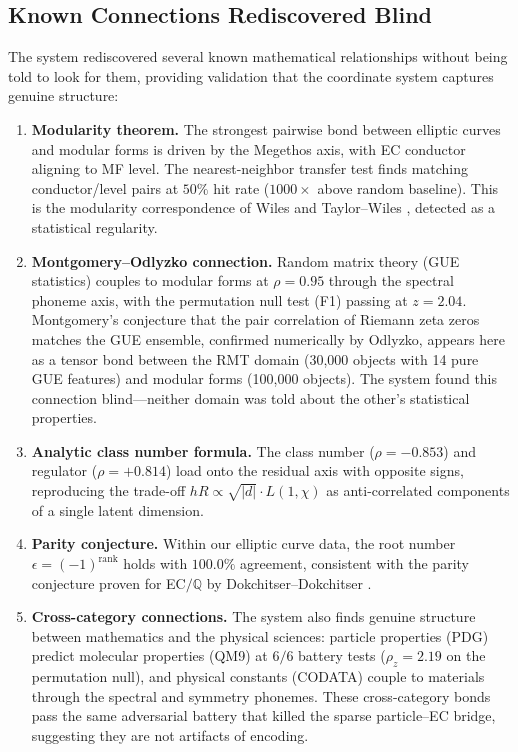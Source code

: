 \documentclass[11pt,a4paper]{article}
\begin{document}
\subsection{Known Connections Rediscovered Blind}

The system rediscovered several known mathematical relationships without being told to look for them, providing validation that the coordinate system captures genuine structure:

\begin{enumerate}[nosep]
    \item \textbf{Modularity theorem.} The strongest pairwise bond between elliptic curves and modular forms is driven by the Megethos axis, with EC conductor aligning to MF level. The nearest-neighbor transfer test finds matching conductor/level pairs at $50\%$ hit rate ($1000\times$ above random baseline). This is the modularity correspondence of Wiles and Taylor--Wiles \cite{dokchitser}, detected as a statistical regularity.

    \item \textbf{Montgomery--Odlyzko connection.} Random matrix theory (GUE statistics) couples to modular forms at $\rho = 0.95$ through the spectral phoneme axis, with the permutation null test (F1) passing at $z = 2.04$. Montgomery's conjecture that the pair correlation of Riemann zeta zeros matches the GUE ensemble, confirmed numerically by Odlyzko, appears here as a tensor bond between the RMT domain (30,000 objects with 14 pure GUE features) and modular forms (100,000 objects). The system found this connection blind---neither domain was told about the other's statistical properties.

    \item \textbf{Analytic class number formula.} The class number ($\rho = -0.853$) and regulator ($\rho = +0.814$) load onto the residual axis with opposite signs, reproducing the trade-off $hR \propto \sqrt{|d|} \cdot L(1, \chi)$ as anti-correlated components of a single latent dimension.

    \item \textbf{Parity conjecture.} Within our elliptic curve data, the root number $\epsilon = (-1)^{\text{rank}}$ holds with $100.0\%$ agreement, consistent with the parity conjecture proven for EC$/\mathbb{Q}$ by Dokchitser--Dokchitser \cite{dokchitser}.

    \item \textbf{Cross-category connections.} The system also finds genuine structure between mathematics and the physical sciences: particle properties (PDG) predict molecular properties (QM9) at $6/6$ battery tests ($\rho_z = 2.19$ on the permutation null), and physical constants (CODATA) couple to materials through the spectral and symmetry phonemes. These cross-category bonds pass the same adversarial battery that killed the sparse particle--EC bridge, suggesting they are not artifacts of encoding.
\end{enumerate}
\end{document}
